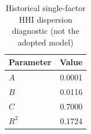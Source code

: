 \begin{table}[htbp]
\centering
\caption{Historical single-factor HHI dispersion diagnostic (not the adopted model)}
\label{tab:power_law_hhi}
\begin{tabular}{lr}
\toprule
\textbf{Parameter} & \textbf{Value} \\
\midrule
$A$ & 0.0001 \\
$B$ & 0.0116 \\
$C$ & 0.7000 \\
$R^2$ & 0.1724 \\
\bottomrule
\end{tabular}
\end{table}
